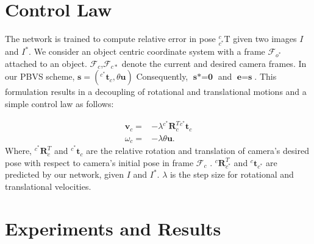 \documentclass[usletter, 10 pt, conference]{ieeeconf}  %
\begin{document}
\section{Control Law}
The network is trained to compute relative error in pose $_{c^*}^{c}\textrm{T}$ given two images $I$ and $I^*$. 
We consider an object centric coordinate system with a frame $\mathcal{F}_{o^*}$ attached to an object. $\mathcal{F}_{c}$,$\mathcal{F}_{c*}$ denote the current and desired camera frames. %
In our PBVS scheme, $\textbf{s}=(^{c^*}\textbf{t}_c, \theta \textbf{u})$
Consequently, $\textbf{s*}=\textbf{0}$ and $\textbf{e}=\textbf{s}$. This formulation results in a decoupling of rotational and translational motions and a simple control law as follows:

\begin{eqnarray}
\textbf{v}_c = & -{\lambda} { ^{c^*}}\textbf{R}^T_c  { ^{c^*}}\textbf{t}_c  \nonumber \\
\textbf{$\omega$}_c = & - {\lambda} \theta \textbf{u}.
\end{eqnarray}
Where, ${ ^{c^*}}\textbf{R}^T_c $ and ${ ^{c^*}}\textbf{t}_c$ are the relative rotation and translation of camera's desired pose with  respect to camera's initial pose in frame  $\mathcal{F}_{c}$ . ${ ^{c}}\textbf{R}^T_{c^*} $ and ${ ^{c}}\textbf{t}_{c^*}$ are predicted by our network, given $I$ and $I^*$. $\lambda$ is the step size for rotational and translational velocities. %

\section{Experiments and Results}
\label{sec:results}
\end{document}
